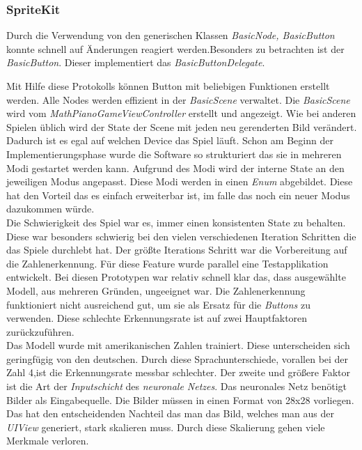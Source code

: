 \subsubsection{SpriteKit}
Durch die Verwendung von den generischen Klassen \textit{BasicNode, BasicButton} konnte schnell auf Änderungen reagiert werden.Besonders zu betrachten ist der \textit{BasicButton}. 
Dieser implementiert das \textit{BasicButtonDelegate}.

Mit Hilfe diese Protokolls können Button mit beliebigen Funktionen erstellt werden. 
Alle Nodes werden effizient in der \textit{BasicScene} verwaltet. Die \textit{BasicScene} wird vom \textit{MathPianoGameViewController} erstellt und angezeigt. Wie bei anderen Spielen üblich wird der State der Scene mit jeden neu gerenderten Bild verändert. Dadurch ist es egal auf welchen Device das Spiel läuft.
Schon am Beginn der Implementierungsphase wurde die Software so strukturiert das sie in mehreren Modi gestartet werden kann. Aufgrund des Modi wird der interne State an den jeweiligen Modus angepasst. Diese Modi werden in einen \textit{Enum} abgebildet. Diese hat den Vorteil das es einfach erweiterbar ist, im falle das noch ein neuer Modus dazukommen würde. \\
Die Schwierigkeit des Spiel war es, immer einen konsistenten State zu behalten. Diese war besonders schwierig bei den vielen verschiedenen Iteration Schritten die das Spiele durchlebt hat. Der größte Iterations Schritt war die Vorbereitung auf die Zahlenerkennung. Für diese Feature wurde  parallel eine Testapplikation entwickelt. Bei diesen Prototypen war relativ schnell klar das, dass ausgewählte Modell, aus mehreren Gründen, ungeeignet war. Die Zahlenerkennung funktioniert nicht ausreichend gut, um sie als Ersatz für die \textit{Buttons} zu verwenden. Diese schlechte Erkennungsrate ist auf zwei Hauptfaktoren zurückzuführen.\\
Das Modell wurde mit amerikanischen Zahlen trainiert. Diese unterscheiden sich geringfügig von den deutschen. Durch diese Sprachunterschiede, vorallen bei der Zahl 4,ist die Erkennungsrate messbar schlechter. Der zweite und größere Faktor ist die Art der \textit{Inputschicht} des \textit{neuronale Netzes}.
Das neuronales Netz benötigt Bilder als Eingabequelle.
Die Bilder müssen in einen Format von 28x28 vorliegen. Das hat den entscheidenden Nachteil das man das Bild, welches man aus der \textit{UIView} generiert, stark skalieren muss. Durch diese Skalierung gehen viele Merkmale verloren.
